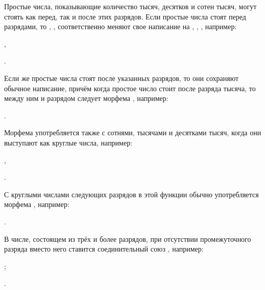 Простые числа, показывающие количество тысяч, десятков и сотен тысяч, могут стоять как перед, так и после этих разрядов. Если простые числа стоят перед разрядами, то , ,  соответственно меняют свое написание на , , , например:
\begin{prfsample}
    \item {},
    \item {}.
\end{prfsample}
Если же простые числа стоят после указанных разрядов, то они сохраняют обычное написание, причём когда простое число стоит после разряда тысяча, то между ним и разрядом следует морфема , например:
\begin{prfsample}
    \item {}.
\end{prfsample}
Морфема  употребляется также с сотнями, тысячами и десятками тысяч, когда они выступают как круглые числа, например:
\begin{prfsample}
    \item {},
    \item {}.
\end{prfsample}
С круглыми числами следующих разрядов в этой функции обычно употребляется морфема , например:
\begin{prfsample}
    \item {}.
\end{prfsample}

В числе, состоящем из трёх и более разрядов, при отсутствии промежуточного разряда вместо него ставится соединительный союз , например:
\begin{prfsample}
    \item {};
    \item {}.
\end{prfsample}

